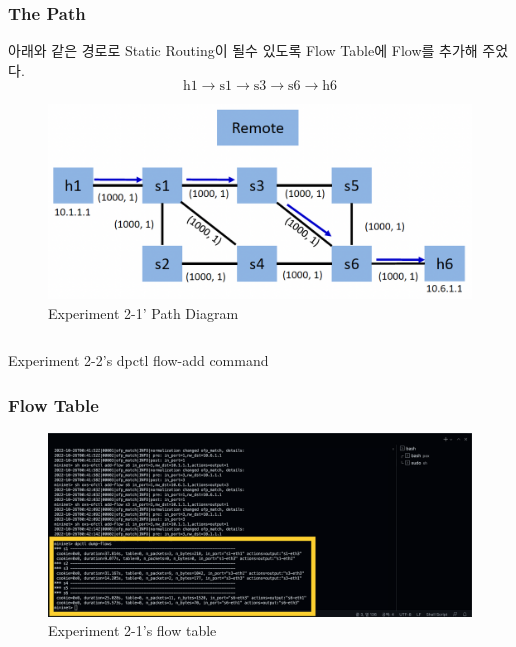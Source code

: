 \subsubsection*{The Path}
아래와 같은 경로로 Static Routing이 될수 있도록 Flow Table에 Flow를 추가해 주었다. 
    \vspace{-2mm}
    \begin{equation*}
    \text{h1}\to\text{s1}\to \text{s3} \to \text{s6}\to\text{h6}
    \end{equation*}
    \vspace{-2mm}
    \vspace{-4mm}
\begin{figure}[!h]\centering 
	\includegraphics[width=.65\textwidth]{image/week08/2-2-0.png}
	\caption{\footnotesize
	 Experiment 2-1’ Path Diagram}
	\vspace{-10pt}
\end{figure}
\begin{listing}[h!]
\inputminted[framerule = 1pt,framesep = 2mm , frame = lines, fontsize=\footnotesize]{python}{./code/week08/flow2-2.sh}
\vspace{-5mm}
\caption{\footnotesize Experiment 2-2’s dpctl flow-add command}
\end{listing}
\clearpage
\subsubsection*{Flow Table}
\begin{figure}[!h]\centering 
	\includegraphics[width=.99\textwidth]{image/week08/2-2-1.png}
	\caption{\footnotesize
	 Experiment 2-1’s flow table}
	\vspace{-10pt}
\end{figure}
